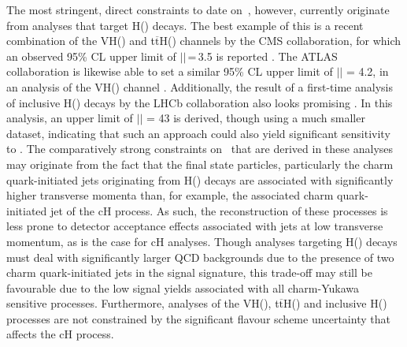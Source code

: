 The most stringent, direct constraints to date on \kappac \,, however, currently originate from analyses that target H(\ccbar) decays. The best example of this is a recent combination of the VH(\ccbar) and t$\overline{\mathrm{t}}$H(\ccbar) channels by the CMS collaboration, for which an observed 95\% CL upper limit of $\mid$\kappac$\mid$\,=\,3.5 is reported \cite{cmscollaboration2025simultaneousprobecharmquark}. The ATLAS collaboration is likewise able to set a similar 95\% CL upper limit of $\mid$\kappac$\mid$ = 4.2, in an analysis of the VH(\ccbar) channel \cite{VHATLAS}. Additionally, the result of a first-time analysis of inclusive H(\ccbar) decays by the LHCb collaboration also looks promising \cite{LHCbCC}. In this analysis, an upper limit of $\mid$\kappac$\mid$ = 43 is derived, though using a much smaller dataset, indicating that such an approach could also yield significant sensitivity to \kappac. The comparatively strong constraints on \kappac\, that are derived in these analyses may originate from the fact that the final state particles, particularly the charm quark-initiated jets originating from H(\ccbar) decays are associated with significantly higher transverse momenta than, for example, the associated charm quark-initiated jet of the cH process. As such, the reconstruction of these processes is less prone to detector acceptance effects associated with jets at low transverse momentum, as is the case for cH analyses. Though analyses targeting H(\ccbar) decays must deal with significantly larger QCD backgrounds due to the presence of two charm quark-initiated jets in the signal signature, this trade-off may still be favourable due to the low signal yields associated with all charm-Yukawa sensitive processes. Furthermore, analyses of the VH(\ccbar), t$\overline{\mathrm{t}}$H(\ccbar) and inclusive H(\ccbar) processes are not constrained by the significant flavour scheme uncertainty that affects the cH process. \\
\\ 
